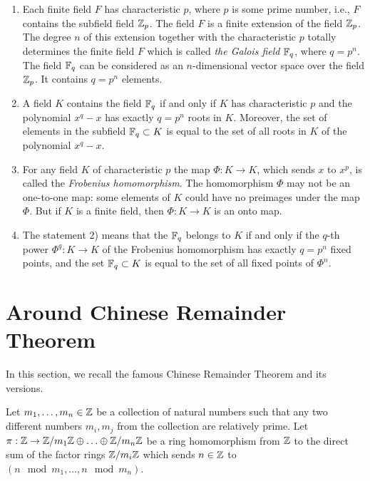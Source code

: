 \documentclass[11pt]{article}
\theoremstyle{plain}
\theoremstyle{definition}
\begin{document}
\begin{enumerate}
\item Each finite field $F$ has  characteristic $p$, where $p$ is some prime number,  i.e., $F$ contains the subfield field $\Bbb Z_p$. The field $F$ is a finite extension of the field $\Bbb Z_p$. The  degree $n$ of this extension together with the characteristic $p$ totally determines the finite field $F$ which is   called {\it the Galois field}    $\Bbb F_q$, where $q=p^n$. The field  $\Bbb F_q$ can be considered as  an $n$-dimensional vector space over the field $\Bbb Z_p$. It contains $q=p^n$ elements.

\item A field $K$ contains the field $\Bbb F_q$ if and only if $K$ has characteristic $p$  and the polynomial $x^q-x$  has exactly $q=p^n$ roots in $K$. Moreover, the set of elements in the subfield $\Bbb F_q\subset K$ is equal to the set of all roots in $K$ of the polynomial  $x^q-x$.
\item For any field $K$ of characteristic $p$ the map $\Phi:K\to K$, which sends $x$ to $x^p$, is called the {\it Frobenius homomorphism}. The  homomorphism $\Phi$ may not   be an one-to-one map: some elements of $K$  could have no preimages under the map $\Phi$. But if $K$ is a finite field, then $\Phi:K\to K$ is  an onto map.

 \item  The statement 2) means that the  $\Bbb F_q$ belongs to $K$ if and only if the $q$-th power $\Phi^q:K\to K$ of the  Frobenius homomorphism has exactly $q=p^n$ fixed points, and the  set $\Bbb F_q\subset K$ is equal to the set of all fixed points of $\Phi^n$.
   \end{enumerate}

\section{Around Chinese  Remainder  Theorem}\label{sectwo}

In this section, we recall  the famous  Chinese  Remainder  Theorem and its versions.

Let $m_1,\dots,m_n\in \Bbb Z$ be a collection of natural numbers such that any two different numbers $m_i, m_j$ from the collection are relatively prime. Let $\pi:\Bbb Z\to \Bbb Z/m_1\Bbb Z \oplus\ldots\oplus \Bbb Z/m_n \Bbb Z$ be a ring homomorphism from  $\Bbb Z$ to the direct sum of the factor rings $\Bbb Z/m_i \Bbb Z$ which sends $n\in  \Bbb Z $ to $(n\mod m_1, \ldots, n\mod m_n)$.
\end{document}
